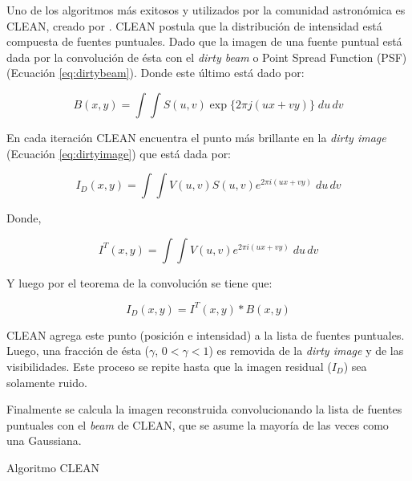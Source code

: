 Uno de los algoritmos más exitosos y utilizados por la comunidad astronómica es CLEAN, creado por \citep{hogbom}. CLEAN postula que la distribución de intensidad está compuesta de fuentes puntuales. Dado que la imagen de una fuente puntual está dada por la convolución de ésta con el \textit{dirty beam} o Point Spread Function (PSF) (Ecuación \ref{eq:dirtybeam}). Donde este último está dado por:

\begin{equation}
B(x,y) = \int\int S(u,v) \exp\{2\pi j(ux+vy)\} \;du\,dv
\label{eq:dirtybeam}
\end{equation}

En cada iteración CLEAN encuentra el punto más brillante en la \textit{dirty image} (Ecuación \ref{eq:dirtyimage}) que está dada por:

\begin{equation}
I_{D}(x,y) = \int\int V(u,v)S(u,v)e^{2\pi i(ux+vy)}\;du\,dv
\label{eq:dirtyimage}
\end{equation}

Donde,

\begin{equation}
I^{T}(x,y) = \int\int V(u,v)e^{2\pi i(ux+vy)}\;du\,dv
\label{eq:fullcoverage}
\end{equation}

Y luego por el teorema de la convolución se tiene que:

\begin{equation}
I_{D}(x,y) = I^{T}(x,y) \ast B(x,y)
\end{equation}

CLEAN agrega este punto (posición e intensidad) a la lista de fuentes puntuales. Luego, una fracción de ésta ($\gamma$, $0 < \gamma < 1$) es removida de la \textit{dirty image} y de las visibilidades. Este proceso se repite hasta que la imagen residual ($I_D$) sea solamente ruido.

Finalmente se calcula la imagen reconstruida convolucionando la lista de fuentes puntuales con el \textit{beam} de CLEAN, que se asume la mayoría de las veces como una Gaussiana.

\begin{algorithm}
\begin{algorithmic}[1]
        \ENDFOR
    \ENDWHILE
\end{algorithmic}
\label{alg:clean}
\caption{Algoritmo CLEAN}
\end{algorithm}


